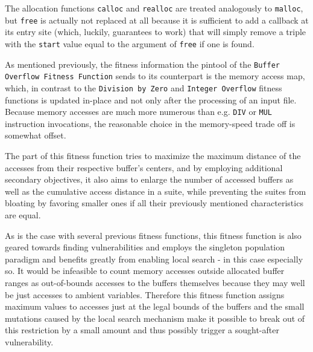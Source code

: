 The allocation functions \texttt{calloc} and \texttt{realloc} are treated analogously to \texttt{malloc}, but
\texttt{free} is actually not replaced at all because it is sufficient to add a callback at its entry site
(which, luckily, \pin guarantees to work) that will simply remove a triple with the \texttt{start} value equal
to the argument of \texttt{free} if one is found.

As mentioned previously, the fitness information the pintool of the \texttt{Buffer Overflow
Fitness Function} sends to its \java counterpart is the memory access map, which, in contrast to the
\texttt{Division by Zero} and \texttt{Integer Overflow} fitness functions is updated in-place and not only
after the processing of an input file. Because memory accesses are much more numerous than e.g. \texttt{DIV}
or \texttt{MUL} instruction invocations, the reasonable choice in the memory-speed trade off is somewhat offset.

The \java part of this fitness function tries to maximize the maximum distance of the accesses from their
respective buffer's centers, and by employing additional secondary objectives, it also aims to enlarge the
number of accessed buffers as well as the cumulative access distance in a suite, while preventing the suites
from bloating by favoring smaller ones if all their previously mentioned characteristics are equal.

As is the case with several previous fitness functions, this fitness function is also geared towards finding
vulnerabilities and employs the singleton population paradigm and benefits greatly from enabling local search -
in this case especially so. It would be infeasible to count memory accesses outside allocated buffer ranges as
out-of-bounds accesses to the buffers themselves because they may well be just accesses to ambient variables.
Therefore this fitness function assigns maximum values to accesses just at the legal bounds of the buffers and
the small mutations caused by the local search mechanism make it possible to break out of this restriction
by a small amount and thus possibly trigger a sought-after vulnerability.
